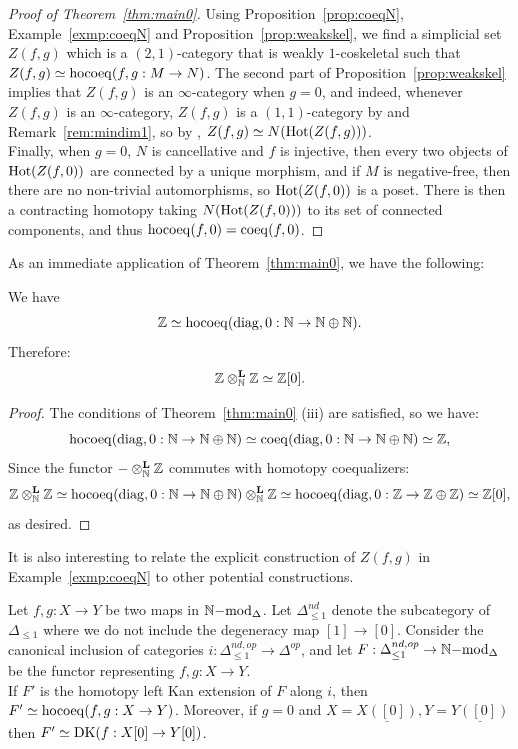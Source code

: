 \begin{proof}[Proof of Theorem~\ref{thm:main0}]
Using Proposition~\ref{prop:coeqN}, Example~\ref{exmp:coeqN} and Proposition~\ref{prop:weakskel}, 
we find a simplicial set $Z(f,g)$ which is a $(2,1)$-category that is weakly $1$-coskeletal 
such that $Z(f,g) \simeq \operatorname{hocoeq}(f,g:M \rightarrow N)$.
The second part of Proposition~\ref{prop:weakskel} implies that $Z(f,g)$ is an $\infty$-category when $g=0$, 
and indeed, whenever $Z(f,g)$ is an $\infty$-category, $Z(f,g)$ is a $(1,1)$-category 
by \cite[Proposition 4.8.1.7]{keradon} and Remark~\ref{rem:mindim1}, so by \cite[Example 4.8.1.3]{keradon}, $Z(f,g) \simeq N(\operatorname{Hot}(Z(f,g)))$.\\
\indent Finally, when $g=0$, $N$ is cancellative and $f$ is injective, then every two objects of $\operatorname{Hot}(Z(f,0))$ are 
connected by a unique morphism, and if $M$ is negative-free,
then there are no non-trivial automorphisms, so $\operatorname{Hot}(Z(f,0))$ is a poset. There is then a 
contracting homotopy taking $N(\operatorname{Hot}(Z(f,0)))$ to its set of connected components, and thus 
$\operatorname{hocoeq}(f,0)=\operatorname{coeq}(f,0)$.
\end{proof}
As an immediate application of Theorem~\ref{thm:main0}, we have the following:
\begin{theorem}\label{thm:ZN}
We have 
\[\mathbb{Z} \simeq \operatorname{hocoeq}(\mathrm{diag},0: \mathbb{N} \rightarrow \mathbb{N} \oplus \mathbb{N}).\]
Therefore:
\[\mathbb{Z} \otimes^{\boldsymbol{\mathrm{L}}}_{\mathbb{N}} \mathbb{Z} \simeq \mathbb{Z}[0].\]
\end{theorem}
\begin{proof}
The conditions of Theorem~\ref{thm:main0} (iii) are satisfied, so we have:
\[\operatorname{hocoeq}(\mathrm{diag},0: \mathbb{N} \rightarrow \mathbb{N} \oplus \mathbb{N}) \simeq \operatorname{coeq}(\mathrm{diag},0: \mathbb{N} \rightarrow \mathbb{N} \oplus \mathbb{N}) \simeq \mathbb{Z},\]
Since the functor $-\otimes^{\boldsymbol{\mathrm{L}}}_{\mathbb{N}} \mathbb{Z}$ commutes with homotopy coequalizers:
\[\mathbb{Z} \otimes^{\boldsymbol{\mathrm{L}}}_{\mathbb{N}} \mathbb{Z} \simeq \operatorname{hocoeq}(\mathrm{diag},0: \mathbb{N} \rightarrow \mathbb{N} \oplus \mathbb{N}) \otimes^{\boldsymbol{\mathrm{L}}}_{\mathbb{N}} \mathbb{Z}
\simeq \operatorname{hocoeq}(\mathrm{diag},0: \mathbb{Z} \rightarrow \mathbb{Z} \oplus \mathbb{Z}) \simeq \mathbb{Z}[0],\]
as desired.
\end{proof}
It is also interesting to relate the explicit construction of $Z(f,g)$ in Example~\ref{exmp:coeqN} to other potential constructions.
\begin{corollary}\label{cor:DKcoeq}
Let $f,g: X \to Y$ be two maps in ${\mathbb{N}\mathrm{-mod}}_{\Delta}$. Let $\Delta^{nd}_{\le 1}$ denote the subcategory of $\Delta_{\le 1}$ 
where we do not include the degeneracy map $[1] \to [0]$. 
Consider the canonical inclusion of categories $i:\Delta^{nd,op}_{\le 1} \to \Delta^{op}$, 
and let $F:\Delta^{nd,op}_{\le 1} \rightarrow {\mathbb{N}\mathrm{-mod}}_{\Delta}$ be the functor representing $f,g:X \to Y$.\\
\indent If $F'$ is the homotopy left Kan extension of $F$ along $i$, then $F' \simeq \operatorname{hocoeq}(f,g: X \rightarrow Y)$. 
Moreover, if $g=0$ and $X=\underline{X([0])}, Y=\underline{Y([0])}$ then $F'\simeq \operatorname{DK}(f: X[0] \rightarrow Y[0])$.
\end{corollary}
